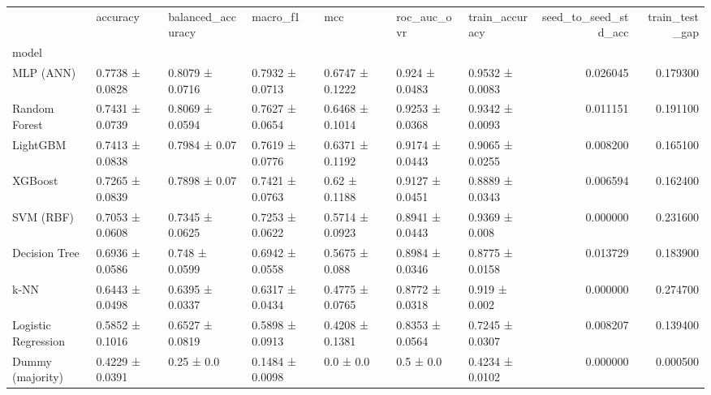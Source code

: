\begin{tabular}{lllllllrr}
\toprule
 & accuracy & balanced_accuracy & macro_f1 & mcc & roc_auc_ovr & train_accuracy & seed_to_seed_std_acc & train_test_gap \\
model &  &  &  &  &  &  &  &  \\
\midrule
MLP (ANN) & 0.7738 ± 0.0828 & 0.8079 ± 0.0716 & 0.7932 ± 0.0713 & 0.6747 ± 0.1222 & 0.924 ± 0.0483 & 0.9532 ± 0.0083 & 0.026045 & 0.179300 \\
Random Forest & 0.7431 ± 0.0739 & 0.8069 ± 0.0594 & 0.7627 ± 0.0654 & 0.6468 ± 0.1014 & 0.9253 ± 0.0368 & 0.9342 ± 0.0093 & 0.011151 & 0.191100 \\
LightGBM & 0.7413 ± 0.0838 & 0.7984 ± 0.07 & 0.7619 ± 0.0776 & 0.6371 ± 0.1192 & 0.9174 ± 0.0443 & 0.9065 ± 0.0255 & 0.008200 & 0.165100 \\
XGBoost & 0.7265 ± 0.0839 & 0.7898 ± 0.07 & 0.7421 ± 0.0763 & 0.62 ± 0.1188 & 0.9127 ± 0.0451 & 0.8889 ± 0.0343 & 0.006594 & 0.162400 \\
SVM (RBF) & 0.7053 ± 0.0608 & 0.7345 ± 0.0625 & 0.7253 ± 0.0622 & 0.5714 ± 0.0923 & 0.8941 ± 0.0443 & 0.9369 ± 0.008 & 0.000000 & 0.231600 \\
Decision Tree & 0.6936 ± 0.0586 & 0.748 ± 0.0599 & 0.6942 ± 0.0558 & 0.5675 ± 0.088 & 0.8984 ± 0.0346 & 0.8775 ± 0.0158 & 0.013729 & 0.183900 \\
k-NN & 0.6443 ± 0.0498 & 0.6395 ± 0.0337 & 0.6317 ± 0.0434 & 0.4775 ± 0.0765 & 0.8772 ± 0.0318 & 0.919 ± 0.002 & 0.000000 & 0.274700 \\
Logistic Regression & 0.5852 ± 0.1016 & 0.6527 ± 0.0819 & 0.5898 ± 0.0913 & 0.4208 ± 0.1381 & 0.8353 ± 0.0564 & 0.7245 ± 0.0307 & 0.008207 & 0.139400 \\
Dummy (majority) & 0.4229 ± 0.0391 & 0.25 ± 0.0 & 0.1484 ± 0.0098 & 0.0 ± 0.0 & 0.5 ± 0.0 & 0.4234 ± 0.0102 & 0.000000 & 0.000500 \\
\bottomrule
\end{tabular}
